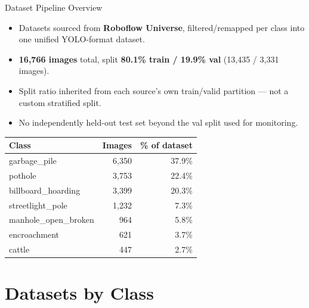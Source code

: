\documentclass[10pt]{beamer}
\begin{document}
\begin{frame}{Dataset Pipeline Overview}
  \begin{itemize}
    \item Datasets sourced from \textbf{Roboflow Universe}, filtered/remapped per class
      into one unified YOLO-format dataset.
    \item \textbf{16,766 images} total, split \textbf{80.1\% train / 19.9\% val}
      (13,435 / 3,331 images).
    \item Split ratio inherited from each source's own train/valid partition — not a custom
      stratified split.
    \item No independently held-out test set beyond the val split used for monitoring.
  \end{itemize}
  \begin{table}
    \centering\small
    \begin{tabular}{lrr}
      \toprule
      Class & Images & \% of dataset \\
      \midrule
      garbage\_pile        & 6{,}350 & 37.9\% \\
      pothole              & 3{,}753 & 22.4\% \\
      billboard\_hoarding  & 3{,}399 & 20.3\% \\
      streetlight\_pole    & 1{,}232 & 7.3\%  \\
      manhole\_open\_broken& 964     & 5.8\%  \\
      encroachment         & 621     & 3.7\%  \\
      cattle               & 447     & 2.7\%  \\
      \bottomrule
    \end{tabular}
  \end{table}
\end{frame}

\section{Datasets by Class}
\end{document}
